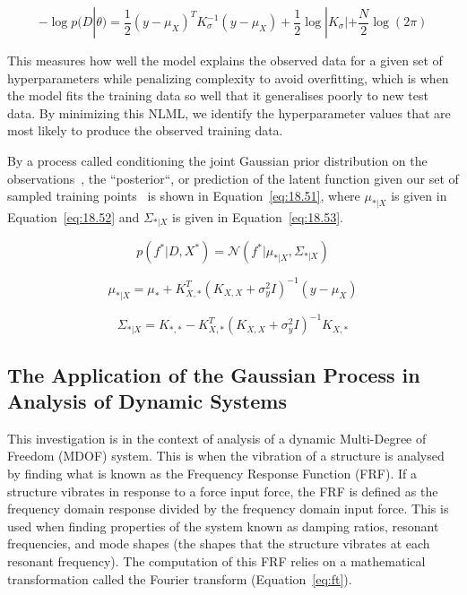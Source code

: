 \documentclass[12pt]{article}
\begin{document}
    \begin{equation}
        -\log p(D|\theta) = \frac{1}{2} (y - \mu_X)^T K_{\sigma}^{-1} (y - \mu_X) + \frac{1}{2} \log |K_{\sigma}| + \frac{N}{2} \log(2\pi)\label{eq:NLML}
    \end{equation}

    This measures how well the model explains the observed data for a given set of hyperparameters while penalizing complexity to avoid overfitting, which is when the model fits the training data so well that it generalises poorly to new test data.
    By minimizing this NLML, we identify the hyperparameter values that are most likely to produce the observed training data.




    By a process called conditioning the joint Gaussian prior distribution on the observations~\cite{rasmussen2006gaussian}, the ``posterior``, or prediction of the latent function given our set of sampled training points~\cite{murphy2023probabilistic} is shown in Equation~\ref{eq:18.51}, where $\mu_{*|X}$ is given in Equation~\ref{eq:18.52} and $\Sigma_{*|X}$ is given in Equation~\ref{eq:18.53}.

    \begin{equation}
        p(f^* | D, X^*) = \mathcal{N}(f^* | \mu_{*|X}, \Sigma_{*|X})\label{eq:18.51}
    \end{equation}

    \begin{equation}
        \mu_{*|X} = \mu_* + K_{X,*}^T (K_{X,X} + \sigma^2_y I)^{-1} (y - \mu_X)\label{eq:18.52}
    \end{equation}

    \begin{equation}
        \Sigma_{*|X} = K_{*,*} - K_{X,*}^T (K_{X,X} + \sigma^2_y I)^{-1} K_{X,*}\label{eq:18.53}
    \end{equation}

    \subsection{The Application of the Gaussian Process in Analysis of Dynamic Systems}

    This investigation is in the context of analysis of a dynamic Multi-Degree of Freedom (MDOF) system.
    This is when the vibration of a structure is analysed by finding what is known as the Frequency Response Function (FRF). If a structure vibrates in response to a force input force, the FRF is defined as the frequency domain response divided by the frequency domain input force.
    This is used when finding properties of the system known as damping ratios, resonant frequencies, and mode shapes (the shapes that the structure vibrates at each resonant frequency).
    The computation of this FRF relies on a mathematical transformation called the Fourier transform (Equation~\ref{eq:ft}).
\end{document}

